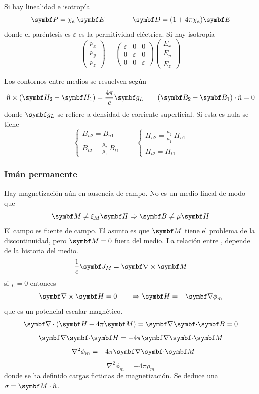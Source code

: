 \documentclass[10pt,oneside]{CBFT_book}
\begin{document}
Si hay linealidad e isotropía
\[
	\vb{P} = \chi_e \: \vb{E} \qquad \qquad \vb{D} = ( 1 + 4 \pi \chi_e ) \vb{E}
\]
donde el paréntesis es $\varepsilon$ es la permitividad eléctrica.
Si hay isotropía
\[
	\begin{pmatrix}
		p_x \\
		p_y \\
		p_z
	\end{pmatrix} 
	=
	\begin{pmatrix}
		\varepsilon & 0 & 0 \\
		0 & \varepsilon & 0 \\
		0 & 0 & \varepsilon
	\end{pmatrix} 
	\begin{pmatrix}
		E_x \\
		E_y \\
		E_z
	\end{pmatrix} 
\]


Los contornos entre medios se resuelven según
\[
	\hat{n} \times (\vb{H}_2 -\vb{H}_1) = \frac{4 \pi}{c} \vb{g}_L \qquad 
	(\vb{B}_2 -\vb{B}_1)\cdot\hat{n} = 0 
\]
donde $\vb{g}_L$ se refiere a densidad de corriente superficial.
Si esta es nula se tiene
\[
	\begin{cases}
	B_{n2} = B_{n1} \\
	\\
	\displaystyle B_{t2} = \frac{\mu_2}{\mu_1}\: B_{t1}
	\end{cases}
	\qquad 
	\begin{cases}
	\displaystyle H_{n2} = \frac{\mu_2}{\mu_1}\: H_{n1} \\
	\\
	H_{t2} = H_{t1} 
	\end{cases}
\]

\subsubsection{Imán permanente}

Hay magnetización  aún en ausencia de campo. No es un medio lineal de modo que
\[
	\vb{M}	 \neq \xi_M \vb{H} \Rightarrow \vb{B} \neq \mu \vb{H}
\]
El campo  es fuente de campo. El asunto es que $\vb{M}$ tiene el problema de
la discontinuidad, pero $ \vb{M} = 0 $ fuera del medio.
La relación entre , depende de la historia del medio.
\[
	\frac{1}{c}\vb{J}_M = \rotorm{M}
\]
si $_L=0$ entonces 
\[
	\rotorm{H} = 0 \qquad \Rightarrow \vb{H} = -\Nabla\phi_m
\]
que es un potencial escalar magnético.
\[
	\Nabla\cdot( \vb{H} + 4\pi\vb{M} ) = \divem{B} = 0
\]
\[
	\divem{H} = -4\pi\divem{M}
\]
\[
	-\nabla^2 \phi_m = -4\pi\divem{M}
\]
\[
	\nabla^2 \phi_m = -4\pi\rho_m
\]
donde se ha definido cargas ficticias de magnetización.
Se deduce una $ \sigma = \vb{M} \cdot \hat{n} $.
\end{document}
